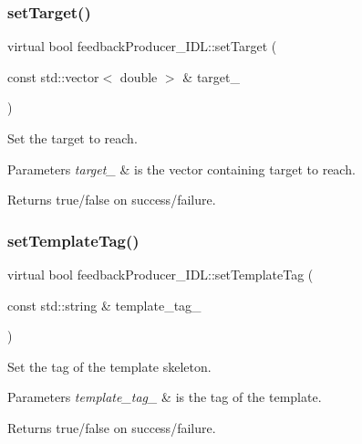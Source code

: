 \subsubsection{\texorpdfstring{setTarget()}{setTarget()}}
{\footnotesize\ttfamily virtual bool feedback\+Producer\+\_\+\+I\+D\+L\+::set\+Target (\begin{DoxyParamCaption}\item[{const std\+::vector$<$ double $>$ \&}]{target\+\_\+ }\end{DoxyParamCaption})\hspace{0.3cm}{\ttfamily [virtual]}}



Set the target to reach. 


\begin{DoxyParams}{Parameters}
{\em target\+\_\+} & is the vector containing target to reach. \\
\hline
\end{DoxyParams}
\begin{DoxyReturn}{Returns}
true/false on success/failure. 
\end{DoxyReturn}
\mbox{\label{classfeedbackProducer__IDL_a9d73388746fdad03567b1930c964c61d}} 
\subsubsection{\texorpdfstring{setTemplateTag()}{setTemplateTag()}}
{\footnotesize\ttfamily virtual bool feedback\+Producer\+\_\+\+I\+D\+L\+::set\+Template\+Tag (\begin{DoxyParamCaption}\item[{const std\+::string \&}]{template\+\_\+tag\+\_\+ }\end{DoxyParamCaption})\hspace{0.3cm}{\ttfamily [virtual]}}



Set the tag of the template skeleton. 


\begin{DoxyParams}{Parameters}
{\em template\+\_\+tag\+\_\+} & is the tag of the template. \\
\hline
\end{DoxyParams}
\begin{DoxyReturn}{Returns}
true/false on success/failure. 
\end{DoxyReturn}
\mbox{\label{classfeedbackProducer__IDL_a0faabb9844bf01590a85e67bd857d7ac}} 
